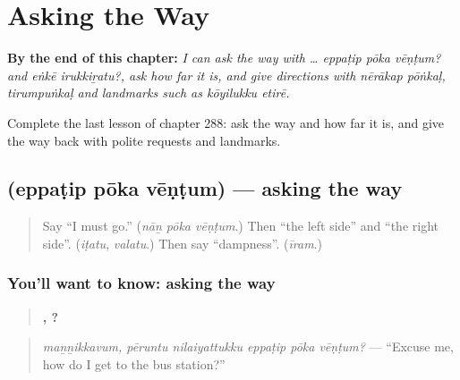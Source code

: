
\chapter{Asking the Way}
\label{ch:ta-asking-the-way}

\begin{chapteropening}
\textbf{By the end of this chapter:} \emph{I can ask the way with … eppaṭip pōka vēṇṭum? and eṅkē irukkiṟatu?, ask how far it is, and give directions with nērākap pōṅkaḷ, tirumpuṅkaḷ and landmarks such as kōyilukku etirē.}

Complete the last lesson of chapter 288: ask the way and how far it is, and give the way back with polite requests and landmarks.
\end{chapteropening}

\section[\texorpdfstring{\ta{எப்படிப்} \ta{போக} \ta{வேண்டும்} (eppaṭip pōka vēṇṭum)}{எப்படிப் போக வேண்டும் (eppaṭip pōka vēṇṭum)}]{   (eppaṭip pōka vēṇṭum) — asking the way}

\label{lesson:TA-C288-eppatip-poka-ventum}



\begin{quote}
Say \textquotedblleft{}I must go.\textquotedblright{} (\emph{nāṉ pōka vēṇṭum}.) Then \textquotedblleft{}the left side\textquotedblright{} and \textquotedblleft{}the right side\textquotedblright{}. (\emph{iṭatu}, \emph{valatu}.) Then say \textquotedblleft{}dampness\textquotedblright{}. (\emph{īram}.)
\end{quote}

\subsection*{You'll want to know: asking the way}
\begin{quote}
\textbf{,     ?}
\end{quote}

\begin{quote}
\emph{maṉṉikkavum, pēruntu nilaiyattukku eppaṭip pōka vēṇṭum?} — \textquotedblleft{}Excuse me, how do I get to the bus station?\textquotedblright{}
\end{quote}

